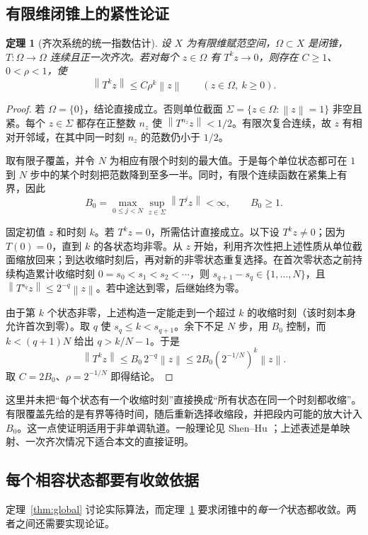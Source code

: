 \documentclass[UTF8,zihao=-4,a4paper]{ctexart}
\newtheorem{theorem}{定理}[section]
\theoremstyle{definition}\newtheorem{example}[theorem]{例}
\newcommand{\norm}[1]{\left\lVert#1\right\rVert}
\begin{document}
\subsection{有限维闭锥上的紧性论证}

\begin{theorem}[齐次系统的统一指数估计]\label{thm:compact}
设 $X$ 为有限维赋范空间，$\Omega\subset X$ 是闭锥，$T:\Omega\to\Omega$ 连续且正一次齐次。若对每个 $z\in\Omega$ 有 $T^kz\to0$，则存在 $C\ge1$、$0<\rho<1$，使
\[
 \norm{T^kz}\le C\rho^k\norm z\qquad(z\in\Omega,\ k\ge0).
\]
\end{theorem}
\begin{proof}
若 $\Omega=\{0\}$，结论直接成立。否则单位截面
$\Sigma=\{z\in\Omega:\norm z=1\}$ 非空且紧。每个 $z\in\Sigma$ 都存在正整数 $n_z$ 使 $\norm{T^{n_z}z}<1/2$。有限次复合连续，故 $z$ 有相对开邻域，在其中同一时刻 $n_z$ 的范数仍小于 $1/2$。

取有限子覆盖，并令 $N$ 为相应有限个时刻的最大值。于是每个单位状态都可在 $1$ 到 $N$ 步中的某个时刻把范数降到至多一半。同时，有限个连续函数在紧集上有界，因此
\[
 B_0=\max_{0\le j<N}\sup_{z\in\Sigma}\norm{T^jz}<\infty,
 \qquad B_0\ge1.
\]

固定初值 $z$ 和时刻 $k$。若 $T^kz=0$，所需估计直接成立。以下设 $T^kz\ne0$；因为 $T(0)=0$，直到 $k$ 的各状态均非零。从 $z$ 开始，利用齐次性把上述性质从单位截面缩放回来；到达收缩时刻后，再对新的非零状态重复选择。在首次零状态之前持续构造累计收缩时刻
$0=s_0<s_1<s_2<\cdots$，则
$s_{q+1}-s_q\in\{1,\ldots,N\}$，且
$\norm{T^{s_q}z}\le2^{-q}\norm z$。若中途达到零，后继始终为零。

由于第 $k$ 个状态非零，上述构造一定能走到一个超过 $k$ 的收缩时刻（该时刻本身允许首次到零）。取 $q$ 使 $s_q\le k<s_{q+1}$。余下不足 $N$ 步，用 $B_0$ 控制，而 $k<(q+1)N$ 给出 $q>k/N-1$。于是
\[
 \norm{T^kz}\le B_0\,2^{-q}\norm z
 \le 2B_0(2^{-1/N})^k\norm z.
\]
取 $C=2B_0$、$\rho=2^{-1/N}$ 即得结论。
\end{proof}

这里并未把“每个状态有一个收缩时刻”直接换成“所有状态在同一个时刻都收缩”。有限覆盖先给的是有界等待时间，随后重新选择收缩段，并把段内可能的放大计入 $B_0$。这一点使证明适用于非单调轨道。一般理论见 Shen--Hu \cite[Theorem 5.3]{ShenHu}；上述表述是单映射、一次齐次情况下适合本文的直接证明。

\subsection{每个相容状态都要有收敛依据}

定理~\ref{thm:global} 讨论实际算法，而定理~\ref{thm:compact} 要求闭锥中的\emph{每一个}状态都收敛。两者之间还需要实现论证。
\end{document}
